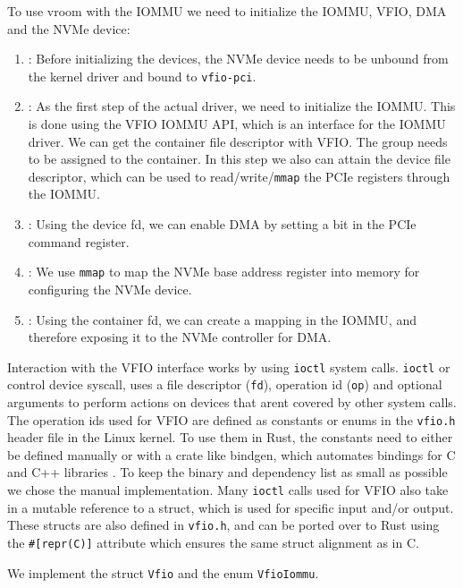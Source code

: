 To use vroom with the IOMMU we need to initialize the IOMMU, VFIO, DMA and the NVMe device:
\begin{enumerate}
    \item \textbf{}: Before initializing the devices, the NVMe device needs to be unbound from the kernel driver and bound to \texttt{vfio-pci}.
    \item \textbf{}: As the first step of the actual driver, we need to initialize the IOMMU. This is done using the VFIO IOMMU API, which is an interface for the IOMMU driver. We can get the container file descriptor with VFIO. The group needs to be assigned to the container. In this step we also can attain the device file descriptor, which can be used to read/write/\texttt{mmap} the PCIe registers through the IOMMU.
    \item \textbf{}: Using the device fd, we can enable DMA by setting a bit in the PCIe command register.
    \item \textbf{}: We use \texttt{mmap} to map the NVMe base address register into memory for configuring the NVMe device.
    \item \textbf{}: Using the container fd, we can create a mapping in the IOMMU, and therefore exposing it to the NVMe controller for DMA.
\end{enumerate}

Interaction with the VFIO interface works by using \texttt{ioctl} system calls.
\texttt{ioctl} or control device syscall, uses a file descriptor (\texttt{fd}), operation id (\texttt{op}) and optional arguments to perform actions on devices that arent covered by other system calls.
The operation ids used for VFIO are defined as constants or enums in the \texttt{vfio.h} header file in the Linux kernel. To use them in Rust, the constants need to either be defined manually or with a crate like bindgen, which automates bindings for C and C++ libraries \cite{cratebindgen}. To keep the binary and dependency list as small as possible we chose the manual implementation.
Many \texttt{ioctl} calls used for VFIO also take in a mutable reference to a struct, which is used for specific input and/or output. These structs are also defined in \texttt{vfio.h}, and can be ported over to Rust using the \texttt{\#[repr(C)]} attribute which ensures the same struct alignment as in C.

We implement the struct \texttt{Vfio} and the enum \texttt{VfioIommu}.

